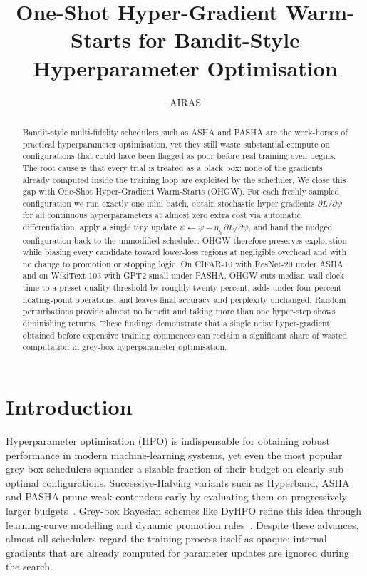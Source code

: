 \documentclass{article}
\title{One-Shot Hyper-Gradient Warm-Starts for Bandit-Style Hyperparameter Optimisation}
\author{AIRAS}
\begin{document}
\maketitle

\begin{abstract}
Bandit-style multi-fidelity schedulers such as ASHA and PASHA are the work-horses of practical hyperparameter optimisation, yet they still waste substantial compute on configurations that could have been flagged as poor before real training even begins. The root cause is that every trial is treated as a black box: none of the gradients already computed inside the training loop are exploited by the scheduler. We close this gap with One-Shot Hyper-Gradient Warm-Starts (OHGW). For each freshly sampled configuration we run exactly one mini-batch, obtain stochastic hyper-gradients \(\partial L/\partial \psi\) for all continuous hyperparameters at almost zero extra cost via automatic differentiation, apply a single tiny update \(\psi \leftarrow \psi - \eta_h\, \partial L/\partial \psi\), and hand the nudged configuration back to the unmodified scheduler. OHGW therefore preserves exploration while biasing every candidate toward lower-loss regions at negligible overhead and with no change to promotion or stopping logic. On CIFAR-10 with ResNet-20 under ASHA and on WikiText-103 with GPT2-small under PASHA, OHGW cuts median wall-clock time to a preset quality threshold by roughly twenty percent, adds under four percent floating-point operations, and leaves final accuracy and perplexity unchanged. Random perturbations provide almost no benefit and taking more than one hyper-step shows diminishing returns. These findings demonstrate that a single noisy hyper-gradient obtained before expensive training commences can reclaim a significant share of wasted computation in grey-box hyperparameter optimisation.
\end{abstract}

\section{Introduction}
Hyperparameter optimisation (HPO) is indispensable for obtaining robust performance in modern machine-learning systems, yet even the most popular grey-box schedulers squander a sizable fraction of their budget on clearly sub-optimal configurations. Successive-Halving variants such as Hyperband, ASHA and PASHA prune weak contenders early by evaluating them on progressively larger budgets~\cite{bohdal-2022-pasha}. Grey-box Bayesian schemes like DyHPO refine this idea through learning-curve modelling and dynamic promotion rules~\cite{wistuba-2022-supervising}. Despite these advances, almost all schedulers regard the training process itself as opaque: internal gradients that are already computed for parameter updates are ignored during the search.
\end{document}

